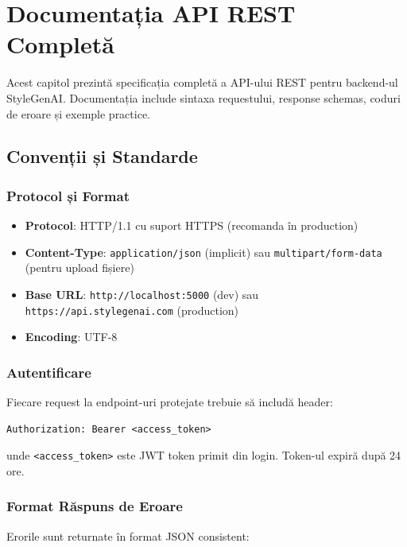 \appendix
\chapter{Documentația API REST Completă}
\label{cap:api_documentation}

Acest capitol prezintă specificația completă a API-ului REST pentru backend-ul StyleGenAI. Documentația include sintaxa requestului, response schemas, coduri de eroare și exemple practice.

\section{Convenții și Standarde}

\subsection{Protocol și Format}

\begin{itemize}
    \item \textbf{Protocol}: HTTP/1.1 cu suport HTTPS (recomanda în production)
    \item \textbf{Content-Type}: \texttt{application/json} (implicit) sau \texttt{multipart/form-data} (pentru upload fișiere)
    \item \textbf{Base URL}: \texttt{http://localhost:5000} (dev) sau \texttt{https://api.stylegenai.com} (production)
    \item \textbf{Encoding}: UTF-8
\end{itemize}

\subsection{Autentificare}

Fiecare request la endpoint-uri protejate trebuie să includă header:

\begin{lstlisting}[language=HTTP]
Authorization: Bearer <access_token>
\end{lstlisting}

unde \texttt{<access\_token>} este JWT token primit din login. Token-ul expiră după 24 ore.

\subsection{Format Răspuns de Eroare}

Erorile sunt returnate în format JSON consistent:

